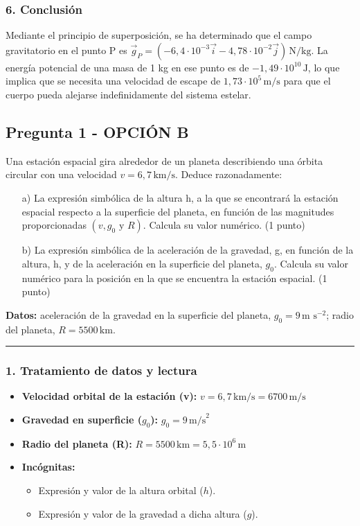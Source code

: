 \subsubsection*{6. Conclusión}
\begin{cajaconclusion}
Mediante el principio de superposición, se ha determinado que el campo gravitatorio en el punto P es $\vec{g}_P = (-6,4 \cdot 10^{-3}\vec{i} - 4,78 \cdot 10^{-2}\vec{j}) \, \text{N/kg}$. La energía potencial de una masa de 1 kg en ese punto es de $-1,49 \cdot 10^{10} \, \text{J}$, lo que implica que se necesita una velocidad de escape de $1,73 \cdot 10^5 \, \text{m/s}$ para que el cuerpo pueda alejarse indefinidamente del sistema estelar.
\end{cajaconclusion}
\newpage

\subsection{Pregunta 1 - OPCIÓN B}
\label{subsec:1B_2025_jun_ord}

\begin{cajaenunciado}
Una estación espacial gira alrededor de un planeta describiendo una órbita circular con una velocidad $v=6,7\,\text{km/s}$. Deduce razonadamente:
\begin{enumerate}
    \item[a)] La expresión simbólica de la altura h, a la que se encontrará la estación espacial respecto a la superficie del planeta, en función de las magnitudes proporcionadas $(v, g_0 \text{ y } R)$. Calcula su valor numérico. (1 punto)
    \item[b)] La expresión simbólica de la aceleración de la gravedad, g, en función de la altura, h, y de la aceleración en la superficie del planeta, $g_0$. Calcula su valor numérico para la posición en la que se encuentra la estación espacial. (1 punto)
\end{enumerate}
\textbf{Datos:} aceleración de la gravedad en la superficie del planeta, $g_{0}=9\,\text{m s}^{-2}$; radio del planeta, $R=5500\,\text{km}$.
\end{cajaenunciado}
\hrule

\subsubsection*{1. Tratamiento de datos y lectura}
\begin{itemize}
    \item \textbf{Velocidad orbital de la estación (v):} $v = 6,7 \, \text{km/s} = 6700 \, \text{m/s}$
    \item \textbf{Gravedad en superficie ($g_0$):} $g_0 = 9 \, \text{m/s}^2$
    \item \textbf{Radio del planeta (R):} $R = 5500 \, \text{km} = 5,5 \cdot 10^6 \, \text{m}$
    \item \textbf{Incógnitas:}
    \begin{itemize}
        \item Expresión y valor de la altura orbital ($h$).
        \item Expresión y valor de la gravedad a dicha altura ($g$).
    \end{itemize}
\end{itemize}


